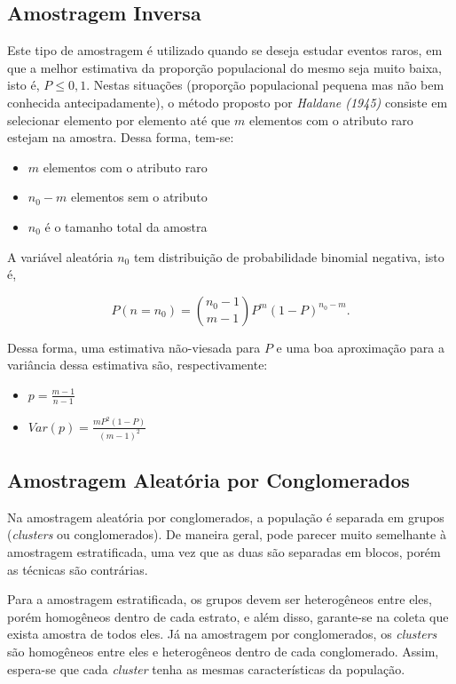 \documentclass[
  portuguese,
]{estat/estat}
\providecommand{\tightlist}{%
  \setlength{\itemsep}{0pt}\setlength{\parskip}{0pt}}
\begin{document}
\subsection{Amostragem Inversa}\label{amostragem-inversa}

Este tipo de amostragem é utilizado quando se deseja estudar eventos
raros, em que a melhor estimativa da proporção populacional do mesmo
seja muito baixa, isto é, \(P \leq 0,1\). Nestas situações (proporção
populacional pequena mas não bem conhecida antecipadamente), o método
proposto por \emph{Haldane (1945)} consiste em selecionar elemento por
elemento até que \(m\) elementos com o atributo raro estejam na amostra.
Dessa forma, tem-se:

\begin{itemize}
\tightlist
\item
  \(m\) elementos com o atributo raro
\item
  \(n_0 - m\) elementos sem o atributo
\item
  \(n_0\) é o tamanho total da amostra
\end{itemize}

A variável aleatória \(n_0\) tem distribuição de probabilidade binomial
negativa, isto é,

\[
P(n=n_0) = {n_0-1 \choose m-1} P^m (1-P)^{n_0-m}.
\]

Dessa forma, uma estimativa não-viesada para \(P\) e uma boa aproximação
para a variância dessa estimativa são, respectivamente:

\begin{itemize}
\tightlist
\item
  \(p = \frac{m-1}{n-1}\)
\item
  \(Var(p) = \frac{m P^2 (1-P)}{(m-1)^2}\)
\end{itemize}

\subsection{Amostragem Aleatória por
Conglomerados}\label{amostragem-aleatuxf3ria-por-conglomerados}

Na amostragem aleatória por conglomerados, a população é separada em
grupos (\emph{clusters} ou conglomerados). De maneira geral, pode
parecer muito semelhante à amostragem estratificada, uma vez que as duas
são separadas em blocos, porém as técnicas são contrárias.

Para a amostragem estratificada, os grupos devem ser heterogêneos entre
eles, porém homogêneos dentro de cada estrato, e além disso, garante-se
na coleta que exista amostra de todos eles. Já na amostragem por
conglomerados, os \emph{clusters} são homogêneos entre eles e
heterogêneos dentro de cada conglomerado. Assim, espera-se que cada
\emph{cluster} tenha as mesmas características da população.
\end{document}

